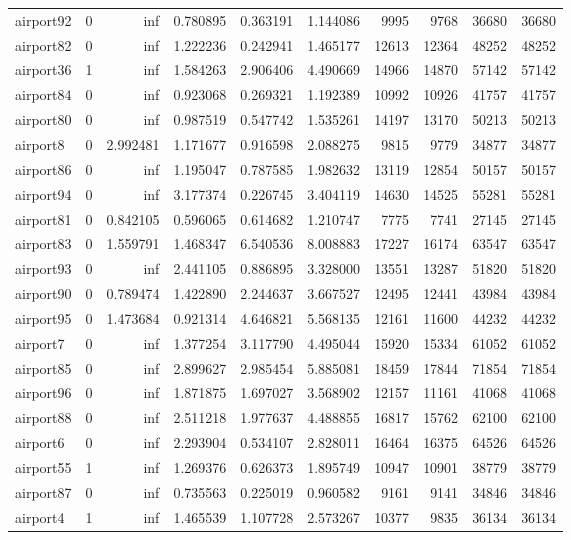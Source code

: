 \begin{longtable}{|l|r|r|r|r|r|r|r|r|r|}
airport92 & 0 & inf & 0.780895 & 0.363191 & 1.144086 & 9995 & 9768 & 36680 & 36680 \\
airport82 & 0 & inf & 1.222236 & 0.242941 & 1.465177 & 12613 & 12364 & 48252 & 48252 \\
airport36 & 1 & inf & 1.584263 & 2.906406 & 4.490669 & 14966 & 14870 & 57142 & 57142 \\
airport84 & 0 & inf & 0.923068 & 0.269321 & 1.192389 & 10992 & 10926 & 41757 & 41757 \\
airport80 & 0 & inf & 0.987519 & 0.547742 & 1.535261 & 14197 & 13170 & 50213 & 50213 \\
airport8 & 0 & 2.992481 & 1.171677 & 0.916598 & 2.088275 & 9815 & 9779 & 34877 & 34877 \\
airport86 & 0 & inf & 1.195047 & 0.787585 & 1.982632 & 13119 & 12854 & 50157 & 50157 \\
airport94 & 0 & inf & 3.177374 & 0.226745 & 3.404119 & 14630 & 14525 & 55281 & 55281 \\
airport81 & 0 & 0.842105 & 0.596065 & 0.614682 & 1.210747 & 7775 & 7741 & 27145 & 27145 \\
airport83 & 0 & 1.559791 & 1.468347 & 6.540536 & 8.008883 & 17227 & 16174 & 63547 & 63547 \\
airport93 & 0 & inf & 2.441105 & 0.886895 & 3.328000 & 13551 & 13287 & 51820 & 51820 \\
airport90 & 0 & 0.789474 & 1.422890 & 2.244637 & 3.667527 & 12495 & 12441 & 43984 & 43984 \\
airport95 & 0 & 1.473684 & 0.921314 & 4.646821 & 5.568135 & 12161 & 11600 & 44232 & 44232 \\
airport7 & 0 & inf & 1.377254 & 3.117790 & 4.495044 & 15920 & 15334 & 61052 & 61052 \\
airport85 & 0 & inf & 2.899627 & 2.985454 & 5.885081 & 18459 & 17844 & 71854 & 71854 \\
airport96 & 0 & inf & 1.871875 & 1.697027 & 3.568902 & 12157 & 11161 & 41068 & 41068 \\
airport88 & 0 & inf & 2.511218 & 1.977637 & 4.488855 & 16817 & 15762 & 62100 & 62100 \\
airport6 & 0 & inf & 2.293904 & 0.534107 & 2.828011 & 16464 & 16375 & 64526 & 64526 \\
airport55 & 1 & inf & 1.269376 & 0.626373 & 1.895749 & 10947 & 10901 & 38779 & 38779 \\
airport87 & 0 & inf & 0.735563 & 0.225019 & 0.960582 & 9161 & 9141 & 34846 & 34846 \\
airport4 & 1 & inf & 1.465539 & 1.107728 & 2.573267 & 10377 & 9835 & 36134 & 36134 \\

\end{longtable}
